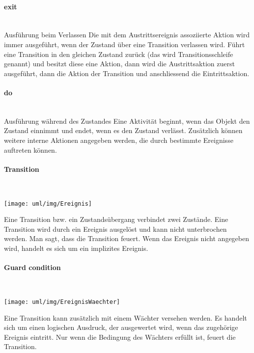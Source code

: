 \begin{minipage}[c]{0.45\linewidth}
\begin{minipage}[c]{0.7\linewidth}
\paragraph{exit}\ \\[2ex]
\ifslides
Ausführung beim Verlassen
\else
Die mit dem Austrittsereignis assoziierte Aktion wird immer ausgef\"uhrt,
wenn der Zustand \"uber eine Transition verlassen wird. F\"uhrt eine
Transition in den gleichen Zustand zur\"uck (das wird Transitionsschleife
genannt) und besitzt diese eine Aktion, dann wird die Austrittsaktion
zuerst ausgef\"uhrt, dann die Aktion der Transition und anschliessend
die Eintrittsaktion.
\fi
%
\paragraph{do}\ \\[2ex]
\ifslides
Ausführung während des Zustandes
\else
Eine Aktivit\"at beginnt, wenn das Objekt den Zustand einnimmt und endet,
wenn es den Zustand verl\"asst. Zus\"atzlich k\"onnen weitere interne
Aktionen angegeben werden, die durch bestimmte Ereignisse auftreten k\"onnen.
\fi
\end{minipage}
%
\paragraph{Transition}\ \\[2ex]
\begin{minipage}[c]{0.28\linewidth}
\texttt{[image: uml/img/Ereignis]}
\end{minipage}
\begin{minipage}[c]{0.7\linewidth}
Eine Transition bzw. ein Zustands\"ubergang verbindet
zwei Zust\"ande. Eine
Transition wird durch ein Ereignis ausgel\"ost und kann
nicht unterbrochen werden.
Man sagt, dass die Transition feuert. Wenn das Ereignis
nicht angegeben wird, handelt
es sich um ein implizites Ereignis.
\end{minipage}
%
\paragraph{Guard condition}\ \\[2ex]
\begin{minipage}[c]{0.28\linewidth}
\texttt{[image: uml/img/EreignisWaechter]}
\end{minipage}
\begin{minipage}[c]{0.7\linewidth}
Eine Transition kann zus\"atzlich mit einem W\"achter versehen werden.
Es handelt sich um einen logischen Ausdruck, der ausgewertet wird,
wenn das zugeh\"orige Ereignis eintritt. Nur wenn die Bedingung des
W\"achters erf\"ullt ist, feuert die Transition.
\end{minipage}
%

\end{minipage}
